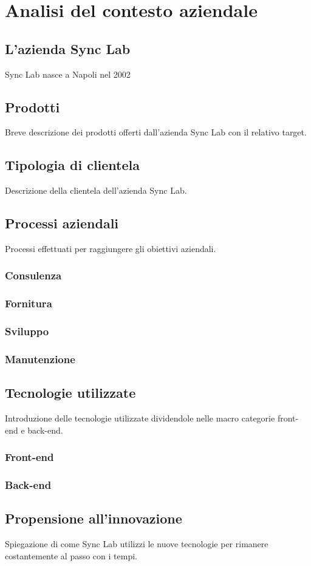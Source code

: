 
\chapter{Analisi del contesto aziendale}
\label{cap:contesto-aziendale}

\section{L'azienda Sync Lab}
Sync Lab nasce a Napoli nel 2002

\section{Prodotti}
Breve descrizione dei prodotti offerti dall'azienda Sync Lab con il relativo target.

\section{Tipologia di clientela}
Descrizione della clientela dell'azienda Sync Lab.

\section{Processi aziendali}
Processi effettuati per raggiungere gli obiettivi aziendali.

\subsection{Consulenza}

\subsection{Fornitura}

\subsection{Sviluppo}

\subsection{Manutenzione}

\section{Tecnologie utilizzate}
Introduzione delle tecnologie utilizzate dividendole nelle macro categorie front-end e back-end.

\subsection{Front-end}

\subsection{Back-end}

\section{Propensione all'innovazione}
Spiegazione di come Sync Lab utilizzi le nuove tecnologie per rimanere costantemente al passo con i tempi.

